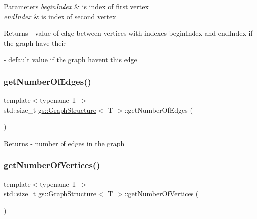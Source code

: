 \begin{DoxyParams}{Parameters}
{\em begin\+Index} & is index of first vertex \\
\hline
{\em end\+Index} & is index of second vertex \\
\hline
\end{DoxyParams}
\begin{DoxyReturn}{Returns}
-\/ value of edge between vertices with indexes \textquotesingle{}begin\+Index\textquotesingle{} and \textquotesingle{}end\+Index\textquotesingle{} if the graph have their 

-\/ default value if the graph haven\textquotesingle{}t this edge 
\end{DoxyReturn}
\mbox{\label{classgs_1_1_graph_structure_ab7f63de5d83e392689eb9e10f776c848}} 
\subsubsection{\texorpdfstring{get\+Number\+Of\+Edges()}{getNumberOfEdges()}}
{\footnotesize\ttfamily template$<$typename T $>$ \\
std\+::size\+\_\+t \mbox{\hyperlink{classgs_1_1_graph_structure}{gs\+::\+Graph\+Structure}}$<$ T $>$\+::get\+Number\+Of\+Edges (\begin{DoxyParamCaption}{ }\end{DoxyParamCaption})}

\begin{DoxyReturn}{Returns}
-\/ number of edges in the graph 
\end{DoxyReturn}
\mbox{\label{classgs_1_1_graph_structure_a973bb790243cd98bceac6188a79f47d6}} 
\subsubsection{\texorpdfstring{get\+Number\+Of\+Vertices()}{getNumberOfVertices()}}
{\footnotesize\ttfamily template$<$typename T $>$ \\
std\+::size\+\_\+t \mbox{\hyperlink{classgs_1_1_graph_structure}{gs\+::\+Graph\+Structure}}$<$ T $>$\+::get\+Number\+Of\+Vertices (\begin{DoxyParamCaption}{ }\end{DoxyParamCaption})}

